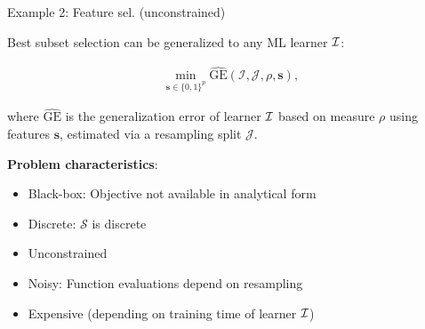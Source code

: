 \documentclass[11pt,compress,t,notes=noshow, xcolor=table]{beamer}
\begin{document}


	
\begin{vbframe}{Example 2: Feature sel. (unconstrained)}

Best subset selection can be generalized to any ML learner $\mathcal{I}$:

\begin{eqnarray*}
	\min_{\textbf{s} \in \{0, 1\}^p} \widehat{\text{GE}}(\mathcal{I}, \mathcal{J}, \rho, \bm{s}),
\end{eqnarray*}

where $\widehat{\text{GE}}$ is the generalization error of learner $\mathcal{I}$ based on measure $\rho$ using features $\bm{s}$, estimated via a resampling split $\mathcal{J}$. 

\lz 

\textbf{Problem characteristics}:
\begin{itemize}
	\item Black-box: Objective not available in analytical form
	\item Discrete: $\mathcal{S}$ is discrete
	\item Unconstrained
	\item Noisy: Function evaluations depend on resampling
	\item Expensive (depending on training time of learner $\mathcal{I}$)
\end{itemize}

\end{vbframe}
\end{document}
